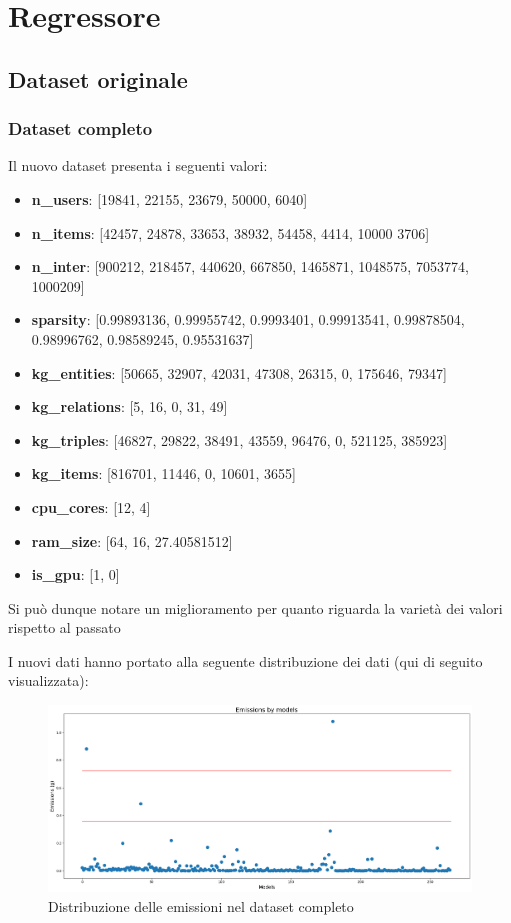 \section{Regressore}

\subsection{Dataset originale}

\subsubsection{Dataset completo}

Il nuovo dataset presenta i seguenti valori:
\begin{itemize}
    \item \textbf{n\_users}: [19841, 22155, 23679, 50000, 6040]
    \item \textbf{n\_items}: [42457, 24878, 33653, 38932, 54458, 4414, 10000 3706]
    \item \textbf{n\_inter}: [900212, 218457, 440620, 667850, 1465871, 1048575, 7053774, 1000209]
    \item \textbf{sparsity}: [0.99893136, 0.99955742, 0.9993401, 0.99913541, 0.99878504, 0.98996762,
    0.98589245, 0.95531637]
    \item \textbf{kg\_entities}: [50665, 32907, 42031, 47308, 26315, 0, 175646, 79347]
    \item \textbf{kg\_relations}: [5, 16, 0, 31, 49]
    \item \textbf{kg\_triples}: [46827, 29822, 38491, 43559, 96476, 0, 521125, 385923]
    \item \textbf{kg\_items}: [816701, 11446, 0, 10601, 3655]
    \item \textbf{cpu\_cores}: [12, 4]
    \item \textbf{ram\_size}: [64, 16, 27.40581512]
    \item \textbf{is\_gpu}: [1, 0]
\end{itemize}

\noindent Si può dunque notare un miglioramento per quanto riguarda la varietà dei valori rispetto al passato

\noindent I nuovi dati hanno portato alla seguente distribuzione dei dati (qui di seguito visualizzata):
\begin{figure}[H]
    \centering
    \includegraphics[scale=0.25]{images/nuova-situazione.png}
    \caption{Distribuzione delle emissioni nel dataset completo}
\end{figure}

